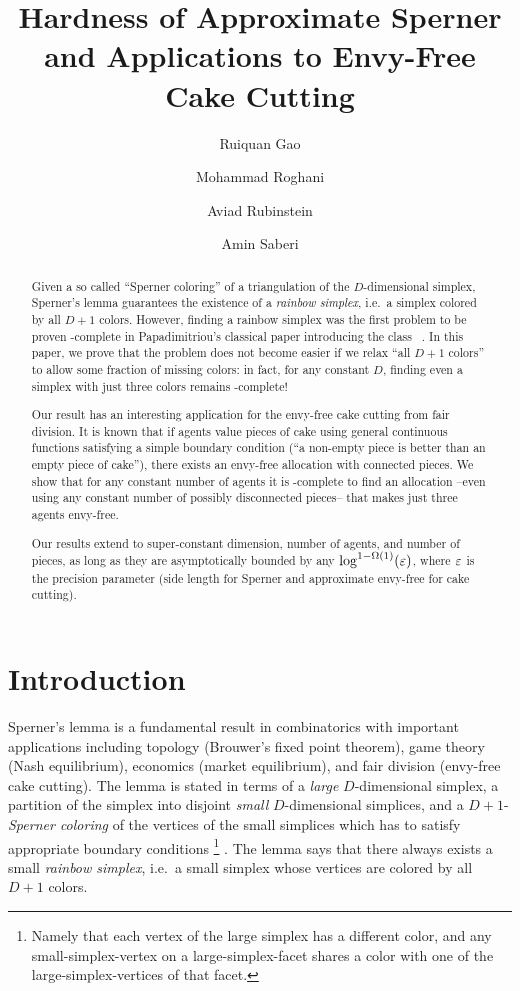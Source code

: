 \documentclass[letterpaper,11pt]{article}
\title{Hardness of Approximate Sperner and Applications to Envy-Free Cake Cutting}
\author[1]{Ruiquan Gao}
\author[1]{Mohammad Roghani}
\author[1]{Aviad Rubinstein}
\author[1]{Amin Saberi}
\affil[1]{Stanford University, \url{{ruiquan, roghani, aviad, saberi}@stanford.edu}}
\date{}
\begin{document}
 \begin{titlepage}
    \maketitle
     \thispagestyle{empty}
     \begin{abstract}
Given a so called ``Sperner coloring'' of a triangulation of the $D$-dimensional simplex, Sperner's lemma guarantees the existence of a {\em rainbow simplex}, i.e.~a simplex colored by all $D+1$ colors. 
However, finding a rainbow simplex was the first problem to be proven \PPAD-complete in Papadimitriou's classical paper introducing the class \PPAD~\cite{DBLP:journals/jcss/Papadimitriou94}.
In this paper, we prove that the problem does not become easier if we relax ``all $D+1$ colors'' to allow some fraction of missing colors: in fact, for any constant $D$, finding even a simplex with just three colors remains \PPAD-complete!


Our result has an interesting application for the envy-free cake cutting from fair division. 
It is known that if agents value pieces of cake using general continuous functions satisfying a simple boundary condition (``a non-empty piece is better than an empty piece of cake''),  there exists an envy-free allocation with connected pieces. We show that for any constant number of agents it is \PPAD-complete to find an allocation --even using any constant number of possibly disconnected pieces-- that makes just three agents envy-free. 

Our results extend to super-constant dimension, number of agents, and number of pieces, as long as they are asymptotically bounded by any $\log^{1-\Omega(1)}(\varepsilon)$, where $\varepsilon$ is the precision parameter (side length for Sperner and approximate envy-free for cake cutting). 

     
     \end{abstract}
 \end{titlepage}

 \newpage

\section{Introduction}

Sperner's lemma is a fundamental result in combinatorics with important applications including topology (Brouwer's fixed point theorem), game theory (Nash equilibrium), economics (market equilibrium), and fair division (envy-free cake cutting). The lemma is stated in terms of a {\em large} $D$-dimensional simplex, a partition of the simplex into disjoint {\em small} $D$-dimensional simplices, and a $D+1$-{\em Sperner coloring} of the vertices of the small simplices which has to satisfy appropriate boundary conditions%
\footnote{Namely that each vertex of the large simplex has a different color, and any small-simplex-vertex on a large-simplex-facet shares a color with one of the large-simplex-vertices of that facet.}
. The lemma says that there always exists a small {\em rainbow simplex}, i.e.~a small simplex whose vertices are colored by all $D+1$ colors. 
\end{document}
